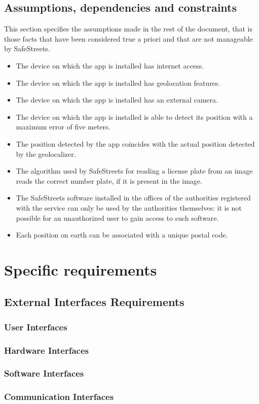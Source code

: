 \documentclass{article}
\newcommand\assumption[1]{\item[{[A#1]}] }
\begin{document}
		\subsection{Assumptions, dependencies and constraints}
			This section specifies the assumptions made in the rest of the document, that is those facts that have been considered true a priori and that are not manageable by SafeStreets.
			\begin{itemize}
				\assumption{1} The device on which the app is installed has internet access.
				\assumption{2} The device on which the app is installed has geolocation features.
				\assumption{3} The device on which the app is installed has an external camera.
				\assumption{4} The device on which the app is installed is able to detect its position with a maximum error of five meters.
				\assumption{5} The position detected by the app coincides with the actual position detected by the geolocalizer.
				\assumption{6} The algorithm used by SafeStreets for reading a license plate from an image reads the correct number plate, if it is present in the image.
				\assumption{7} The SafeStreets software installed in the offices of the authorities registered with the service can only be used by the authorities themselves: it is not possible for an unauthorized user to gain access to such software.
				\assumption{8} Each position on earth can be associated with a unique postal code.
			\end{itemize}
	
	\section{Specific requirements}
		\subsection{External Interfaces Requirements}
			\subsubsection{User Interfaces}
			\subsubsection{Hardware Interfaces}
			\subsubsection{Software Interfaces}
			\subsubsection{Communication Interfaces}
\end{document}
